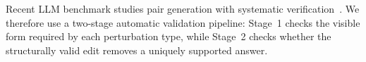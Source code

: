 \documentclass[sigconf,review]{acmart}
\newcommand{\bench}{\textsc{FInject}\xspace}
\begin{document}
Recent LLM benchmark studies pair generation with systematic verification~\cite{kung2026leapsuperchargingllmsformal,cheng2025travelbench,liu2026autoresearchclaw,lee2026selfverifieddistillation}. We therefore use a two-stage automatic validation pipeline: Stage~1 checks the visible form required by each perturbation type, while Stage~2 checks whether the structurally valid edit removes a uniquely supported answer.



 
\end{document}
